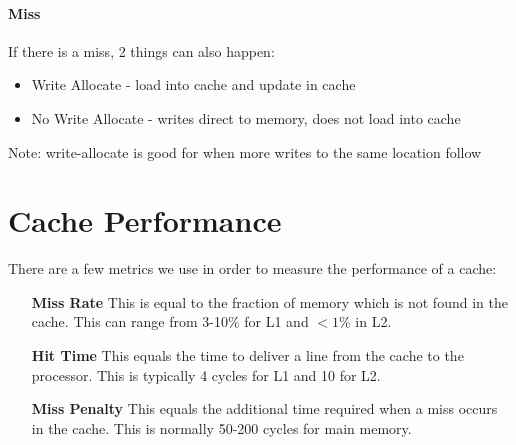 \documentclass[12pt]{book}
\begin{document}
\paragraph{Miss}
If there is a miss, 2 things can also happen:
\begin{itemize}
        \item Write Allocate - load into cache and update in cache
        \item No Write Allocate - writes direct to memory, does not load into
                cache
\end{itemize}
Note: write-allocate is good for when more writes to the same location follow

\section*{Cache Performance}
There are a few metrics we use in order to measure the performance 
of a cache:
\begin{itemize}
        \item[\textbf{Miss Rate}] This is equal to the fraction of memory which 
                is not found in the cache. This can range from 3-10\%
                for L1 and $<1\%$ in L2.
        \item[\textbf{Hit Time}] This equals the time to deliver a line from the cache
                to the processor. This is typically 4 cycles for L1 and 
                10 for L2.
        \item[\textbf{Miss Penalty}] This equals the additional time required 
                when a miss occurs in the cache. This is normally 
                50-200 cycles for main memory.
\end{itemize}
\end{document}
